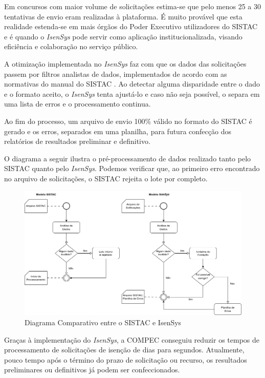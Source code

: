 \documentclass[
	12pt,			%
	openright,		%
	oneside,	
	a4paper,		%
	english,		%
	brazil			%
]{abntex2/abntex2}  %
\begin{document}
		Em concursos com maior volume de solicitações estima-se que pelo menos 25 a 30 tentativas de envio eram realizadas à plataforma. É muito provável que esta realidade estenda-se em mais órgãos do Poder Executivo utilizadores do SISTAC e é quando o \textit{IsenSys} pode servir como aplicação institucionalizada, visando eficiência e colaboração no serviço público.
		
		A otimização implementada no \textit{IsenSys} faz com que os dados das solicitações passem por filtros analistas de dados, implementados de acordo com as normativas do manual do SISTAC \cite{sistac-formatos}. Ao detectar alguma disparidade entre o dado e o formato aceito, o \textit{IsenSys} tenta ajustá-lo e caso não seja possível, o separa em uma lista de erros e o processamento continua.
		
		Ao fim do processo, um arquivo de envio 100\% válido no formato do SISTAC é gerado e os erros, separados em uma planilha, para futura confecção dos relatórios de resultados preliminar e definitivo.
		
		O diagrama a seguir ilustra o pré-processamento de dados realizado tanto pelo SISTAC quanto pelo \textit{IsenSys}. Podemos verificar que, ao primeiro erro encontrado no arquivo de solicitações, o SISTAC rejeita o lote por completo.
		
		\begin{figure}[ht]
			\begin{center}
				
				\caption{Diagrama Comparativo entre o SISTAC e IsenSys}
				\includegraphics[scale=0.4]{img/diagrama-ativs-ganhos}
				
			\end{center}
		\end{figure}
		
		Graças à implementação do \textit{IsenSys}, a COMPEC conseguiu reduzir os tempos de processamento de solicitações de isenção de dias para segundos. Atualmente, pouco tempo após o término do prazo de solicitação ou recurso, os resultados preliminares ou definitivos já podem ser confeccionados.
		
\end{document}
